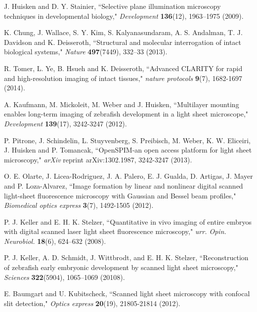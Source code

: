 \documentclass[12pt]{spieman}  %
\begin{document}
\begin{thebibliography}{0}

 J. Huisken and D. Y. Stainier, ``Selective plane illumination microscopy techniques in developmental biology," \emph{Development} \textbf{136}(12), 1963–1975 (2009).

 K. Chung, J. Wallace, S. Y. Kim, S. Kalyanasundaram, A. S. Andalman, T. J. Davidson and K. Deisseroth, ``Structural and molecular interrogation of intact biological systems," \emph{Nature} \textbf{497}(7449), 332–33 (2013).

 R. Tomer, L. Ye, B. Hsueh and K. Deisseroth, ``Advanced CLARITY for rapid and high-resolution imaging of intact tissues," \emph{nature protocols} \textbf{9}(7), 1682-1697 (2014).

 A. Kaufmann, M. Mickoleit, M. Weber and J. Huisken, ``Multilayer mounting enables long-term imaging of zebrafish development in a light sheet microscope," \emph{Development} \textbf{139}(17), 3242-3247 (2012).

 P. Pitrone, J. Schindelin, L. Stuyvenberg, S. Preibisch, M. Weber, K. W. Eliceiri, J. Huisken and P. Tomancak, ``OpenSPIM-an open access platform for light sheet microscopy," \emph{arXiv} reprint arXiv:1302.1987, 3242-3247 (2013).

 O. E. Olarte, J. Licea-Rodriguez, J. A. Palero, E. J. Gualda, D. Artigas, J. Mayer and P. Loza-Alvarez, ``Image formation by linear and nonlinear digital scanned light-sheet fluorescence microscopy with Gaussian and Bessel beam profiles," \emph{Biomedical optics express} \textbf{3}(7), 1492-1505 (2012).

 P. J. Keller and E. H. K. Stelzer, ``Quantitative in vivo imaging of entire embryos with digital scanned laser light sheet fluorescence microscopy," \emph{urr. Opin. Neurobiol.} \textbf{18}(6), 624–632 (2008).

 P. J. Keller, A. D. Schmidt, J. Wittbrodt, and E. H. K. Stelzer, ``Reconstruction of zebrafish early embryonic development by scanned light sheet microscopy," \emph{Sciences} \textbf{322}(5904), 1065–1069 (20108).

 E. Baumgart and U. Kubitscheck, ``Scanned light sheet microscopy with confocal slit detection," \emph{Optics express} \textbf{20}(19), 21805-21814 (2012).


\end{thebibliography}
\end{document}
